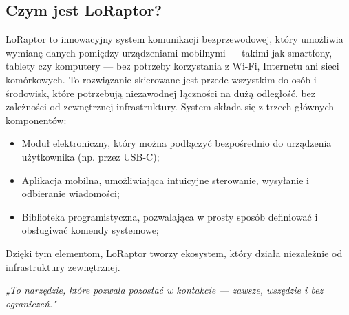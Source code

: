 \subsection{Czym jest LoRaptor?}

LoRaptor to innowacyjny system komunikacji bezprzewodowej, który umożliwia wymianę danych pomiędzy urządzeniami mobilnymi --- takimi jak smartfony, tablety czy komputery --- bez potrzeby korzystania z Wi-Fi, Internetu ani sieci komórkowych. To rozwiązanie skierowane jest przede wszystkim do osób i środowisk, które potrzebują niezawodnej łączności na dużą odległość, bez zależności od zewnętrznej infrastruktury.
System składa się z trzech głównych komponentów:
\begin{itemize}
	\item Moduł elektroniczny, który można podłączyć bezpośrednio do urządzenia użytkownika (np. przez USB-C);
	\item Aplikacja mobilna, umożliwiająca intuicyjne sterowanie, wysyłanie i odbieranie wiadomości;
	\item Biblioteka programistyczna, pozwalająca w prosty sposób definiować i obsługiwać komendy systemowe;
\end{itemize}
Dzięki tym elementom, LoRaptor tworzy ekosystem, który działa niezależnie od infrastruktury zewnętrznej.

\begin{tcolorbox}[
	colback=gray!5!white, 
	colframe=gray!75!black, 
	boxrule=0.8pt, 
	arc=5pt,
	enhanced,
	drop shadow,
	top=8pt,
	bottom=8pt,
	center
]
	\begin{center}
		\emph{„To narzędzie, które pozwala pozostać w kontakcie --- zawsze, wszędzie i bez ograniczeń."}
	\end{center}
\end{tcolorbox}